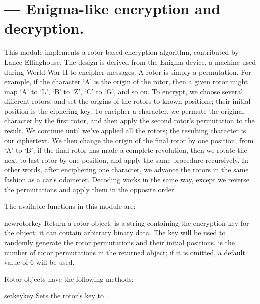 \section{ ---
         Enigma-like encryption and decryption.}



This module implements a rotor-based encryption algorithm, contributed by
Lance Ellinghouse.  The design is derived
from the Enigma device, a machine
used during World War II to encipher messages.  A rotor is simply a
permutation.  For example, if the character `A' is the origin of the rotor,
then a given rotor might map `A' to `L', `B' to `Z', `C' to `G', and so on.
To encrypt, we choose several different rotors, and set the origins of the
rotors to known positions; their initial position is the ciphering key.  To
encipher a character, we permute the original character by the first rotor,
and then apply the second rotor's permutation to the result. We continue
until we've applied all the rotors; the resulting character is our
ciphertext.  We then change the origin of the final rotor by one position,
from `A' to `B'; if the final rotor has made a complete revolution, then we
rotate the next-to-last rotor by one position, and apply the same procedure
recursively.  In other words, after enciphering one character, we advance
the rotors in the same fashion as a car's odometer. Decoding works in the
same way, except we reverse the permutations and apply them in the opposite
order.

The available functions in this module are:

\begin{funcdesc}{newrotor}{key}
Return a rotor object.  is a string containing the encryption key
for the object; it can contain arbitrary binary data. The key will be used
to randomly generate the rotor permutations and their initial positions.
 is the number of rotor permutations in the returned object;
if it is omitted, a default value of 6 will be used.
\end{funcdesc}

Rotor objects have the following methods:

\begin{methoddesc}[rotor]{setkey}{key}
Sets the rotor's key to .
\end{methoddesc}

